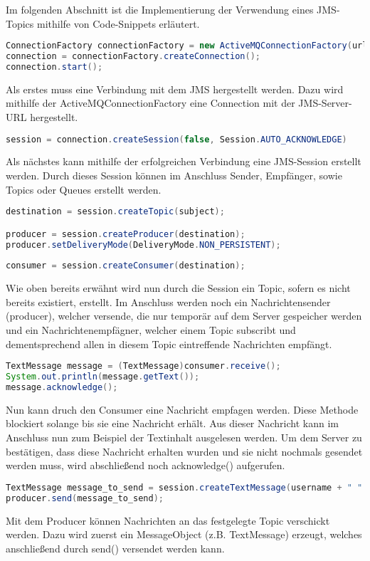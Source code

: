 \documentclass[11pt, a4paper]{article}
\begin{document}
Im folgenden Abschnitt ist die Implementierung der Verwendung eines JMS-Topics mithilfe von Code-Snippets erläutert.
\begin{lstlisting}[language=Java]
ConnectionFactory connectionFactory = new ActiveMQConnectionFactory(url);
connection = connectionFactory.createConnection();
connection.start();
\end{lstlisting}
Als erstes muss eine Verbindung mit dem JMS hergestellt werden. Dazu wird mithilfe der ActiveMQConnectionFactory eine Connection mit der JMS-Server-URL
hergestellt.
\begin{lstlisting}[language=Java]
session = connection.createSession(false, Session.AUTO_ACKNOWLEDGE)
\end{lstlisting}
Als nächstes kann mithilfe der erfolgreichen Verbindung eine JMS-Session erstellt werden. Durch dieses Session können im Anschluss Sender, Empfänger, sowie
Topics oder Queues erstellt werden.
\begin{lstlisting}[language=Java]
destination = session.createTopic(subject);

producer = session.createProducer(destination);
producer.setDeliveryMode(DeliveryMode.NON_PERSISTENT);
		
consumer = session.createConsumer(destination);
\end{lstlisting}
Wie oben bereits erwähnt wird nun durch die Session ein Topic, sofern es nicht bereits existiert, erstellt.
Im Anschluss werden noch ein Nachrichtensender (producer), welcher versende, die nur temporär auf dem Server gespeicher werden und ein Nachrichtenempfägner,
welcher einem Topic subscribt und dementsprechend allen in diesem Topic eintreffende Nachrichten empfängt.
\begin{lstlisting}[language=Java]
TextMessage message = (TextMessage)consumer.receive();
System.out.println(message.getText());
message.acknowledge();
\end{lstlisting}
Nun kann druch den Consumer eine Nachricht empfagen werden. Diese Methode blockiert solange bis sie eine Nachricht erhält. Aus dieser Nachricht kann im
Anschluss nun zum Beispiel der Textinhalt ausgelesen werden. Um dem Server zu bestätigen, dass diese Nachricht erhalten wurden und sie nicht nochmals gesendet
werden muss, wird abschließend noch acknowledge() aufgerufen.
\begin{lstlisting}[language=Java]
TextMessage message_to_send = session.createTextMessage(username + " " +  ip + ": " + message);
producer.send(message_to_send);
\end{lstlisting}
Mit dem Producer können Nachrichten an das festgelegte Topic verschickt werden. Dazu wird zuerst ein MessageObject (z.B. TextMessage) erzeugt, welches
anschließend durch send() versendet werden kann.
\end{document}
